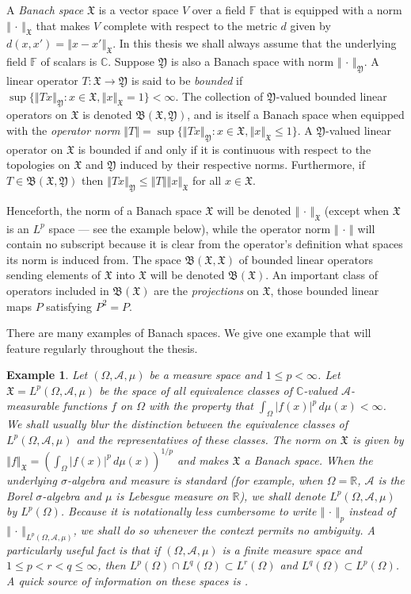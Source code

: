 \documentclass[honours,12pt]{unswthesis}
\newcommand{\R}{\mathbb{R}}
\newcommand{\C}{\mathbb{C}}
\newcommand{\F}{\mathbb{F}}
\newcommand{\B}{\mathfrak{B}}
\newcommand{\X}{\mathfrak{X}}
\newcommand{\Y}{\mathfrak{Y}}
\newcommand{\A}{\mathcal{A}}
\def\norm#1{\left \Vert #1 \right \Vert}
\newtheorem{example}[theorem]{Example}
\numberwithin{equation}{section}
\begin{document}
A {\em Banach space} $\X$ is a vector space $V$ over a field $\F$ that is 
equipped with a norm
$\norm{\,\cdot\,}_{\X}$ that makes $V$ complete with respect to the metric $d$
given by $d(x,x')=\norm{x-x'}_{\X}$. In this thesis we shall always assume that
the
underlying field $\F$ of scalars is $\C$. Suppose $\Y$ is also a Banach space
with norm $\norm{\,\cdot\,}_{\Y}$. A linear operator
$T:\X\rightarrow\Y$ is said to be {\em bounded} if
$\sup\{\norm{Tx}_{\Y}:x\in\X,\norm{x}_{\X}=1\}<\infty$. The collection of
$\Y$-valued bounded linear operators on $\X$ is denoted $\B(\X,\Y)$, and is
itself a Banach space when equipped with the {\em operator norm}
$\norm{T}=\sup\{\norm{Tx}_{\Y}:x\in\X,\norm{x}_{\X}\leq 1\}$. A $\Y$-valued
linear
operator on $\X$ is bounded if and only if it is continuous with respect to the
topologies on $\X$ and $\Y$ induced by their respective norms. Furthermore, if
$T\in\B(\X,\Y)$ then $\norm{Tx}_{\Y}\leq\norm{T}\norm{x}_{\X}$ for all $x\in\X$.

Henceforth, the norm of a Banach space $\X$ will be denoted
$\norm{\,\cdot\,}_{\X}$ (except when $\X$ is an $L^p$ space --- see the
example below), while the operator norm $\norm{\,\cdot\,}$ will
contain no subscript because it is clear from the operator's definition what
spaces its norm is induced from. The space $\B(\X,\X)$ of bounded linear
operators sending elements of $\X$ into $\X$ will be denoted $\B(\X)$. An
important class of operators included in $\B(\X)$ are the {\em projections} on
$\X$, those bounded linear maps $P$ satisfying $P^2=P$.

There are many examples of Banach spaces. We give one example that will feature
regularly throughout the thesis.

\begin{example}\label{L^p example}
Let $(\Omega,\A,\mu)$ be a measure space and $1\leq p<\infty$. Let
$\X=L^p(\Omega,\A,\mu)$ be the space of all equivalence classes of
$\C$-valued $\A$-measurable functions $f$ on $\Omega$ with the property that
$\int_{\Omega}|f(x)|^p\,d\mu(x)<\infty$. We shall usually blur the distinction
between the equivalence classes of $L^p(\Omega,\A,\mu)$ and the representatives
of these classes. The norm on $\X$ is given by
$\norm{f}_{\X}=(\int_{\Omega}|f(x)|^p\,d\mu(x))^{1/p}$ and
makes $\X$ a Banach space. When the underlying $\sigma$-algebra and measure is
standard (for example, when $\Omega=\R$, $\A$ is the Borel $\sigma$-algebra
and $\mu$ is Lebesgue measure on $\R$), we shall denote
$L^p(\Omega,\A,\mu)$ by $L^p(\Omega)$. 
Because it
is notationally less cumbersome to write $\norm{\,\cdot\,}_p$ instead of
$\norm{\,\cdot\,}_{L^p(\Omega,\A,\mu)}$, we shall do so whenever the context
permits no ambiguity. A particularly useful fact is that if $(\Omega,\A,\mu)$ is
a finite measure space and $1\leq p<r<q\leq\infty$, then
$L^p(\Omega)\cap L^q(\Omega)\subset L^r(\Omega)$ and
$L^q(\Omega)\subset L^p(\Omega)$. A quick source of information on these spaces
is \cite[\S 6.4]{Pedersen}.
\end{example}
\end{document}
